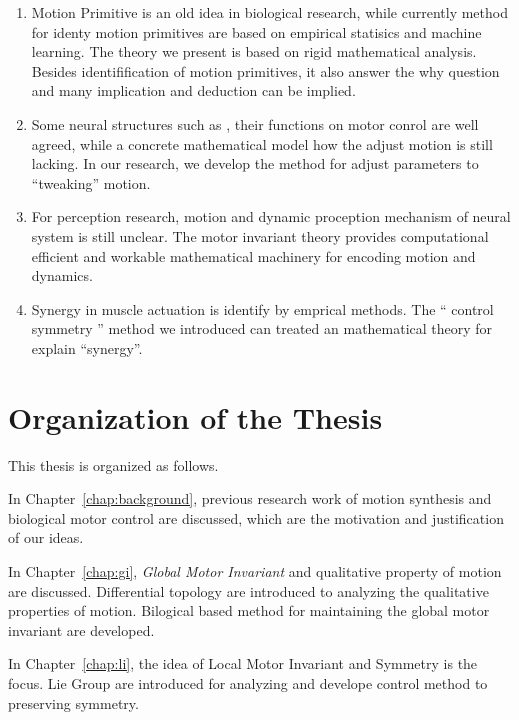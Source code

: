 \begin{enumerate}
\item Motion Primitive is an old idea in biological research, while currently method for identy motion primitives are based on empirical statisics and machine learning.
The theory we present is based on rigid mathematical analysis.
Besides identifification of  motion primitives, it also answer the why question and many implication and deduction can be implied.

\item Some neural structures such as \cpg , their functions on motor conrol are well agreed, while a concrete mathematical model how the \cpg adjust motion is still lacking.
In our research, we develop the method for adjust \cpg parameters to ``tweaking'' motion. 

\item For perception research, motion and dynamic proception mechanism of neural system is still unclear.
The motor invariant theory provides computational efficient and workable mathematical machinery for encoding motion and dynamics.

\item Synergy in muscle actuation is identify by emprical methods. The `` control symmetry '' method we introduced can treated an mathematical theory for explain  ``synergy''.
\end{enumerate}







\section{Organization of the Thesis}

This thesis is organized as follows.
 
In Chapter~\ref{chap:background}, previous research work of motion synthesis and biological motor control are discussed, which are the motivation and justification of our ideas.
 
In Chapter~\ref{chap:gi}, \emph{Global Motor Invariant} and qualitative property of motion are discussed. 
Differential topology are introduced to analyzing the qualitative properties of motion.
Bilogical based  method for maintaining the global motor invariant are developed.

In Chapter~\ref{chap:li}, the idea of Local Motor Invariant and Symmetry is the focus.
Lie Group are introduced for analyzing and develope control method to preserving symmetry. 



